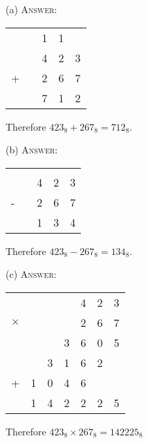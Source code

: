 
(a)
\textsc{Answer:}\vspace{-2mm}
\begin{answerlong}
\begin{longtable}{ccccc}
  &   & 1 & 1 &   \\
  &   & 4 & 2 & 3 \\
+ &   & 2 & 6 & 7 \\ \hline
  &   & 7 & 1 & 2 \\ \hline
\end{longtable}
Therefore $423_{8} + 267_{8} = 712_{8}$.
\end{answerlong}
  
(b)
\textsc{Answer:}\vspace{-2mm}
\begin{answerlong}
\begin{longtable}{ccccc}
  &   &   &   &   \\
  &   & 4 & 2 & 3 \\
- &   & 2 & 6 & 7 \\ \hline
  &   & 1 & 3 & 4 \\ \hline
\end{longtable}
Therefore $423_{8} - 267_{8} = 134_{8}$.
\end{answerlong}

(c)
\textsc{Answer:}\vspace{-2mm}
\begin{answerlong}
\begin{longtable}{cccccc}
         &   &   &   & 4 & 2 & 3 \\
$\times$ &   &   &   & 2 & 6 & 7 \\ \hline
         &   &   & 3 & 6 & 0 & 5 \\
         &   & 3 & 1 & 6 & 2 &   \\
 +       & 1 & 0 & 4 & 6 &   &   \\ \hline
         & 1 & 4 & 2 & 2 & 2 & 5 \\ \hline
\end{longtable}
Therefore $423_{8} \times 267_{8} = 142225_{8}$
\end{answerlong}
